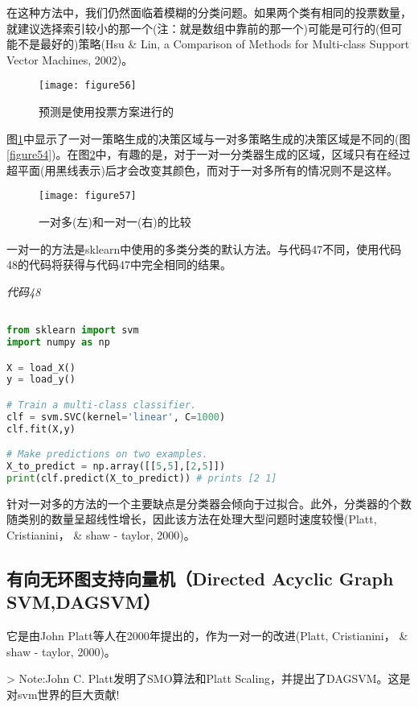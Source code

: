 在这种方法中，我们仍然面临着模糊的分类问题。如果两个类有相同的投票数量，就建议选择索引较小的那一个(注：就是数组中靠前的那一个)可能是可行的(但可能不是最好的)策略(Hsu \& Lin, a Comparison of Methods for Multi-class Support Vector Machines, 2002)。

\begin{figure}[ht]
	\centering
	\texttt{[image: figure56]}
	\caption{预测是使用投票方案进行的}
	\label{figure56}
\end{figure}


图\ref{figure56}中显示了一对一策略生成的决策区域与一对多策略生成的决策区域是不同的(图\ref{figure54})。在图\ref{figure57}中，有趣的是，对于一对一分类器生成的区域，区域只有在经过超平面(用黑线表示)后才会改变其颜色，而对于一对多所有的情况则不是这样。

\begin{figure}[ht]
	\centering
	\texttt{[image: figure57]}
	\caption{一对多(左)和一对一(右)的比较}
	\label{figure57}
\end{figure}

一对一的方法是sklearn中使用的多类分类的默认方法。与代码47不同，使用代码48的代码将获得与代码47中完全相同的结果。

\emph{代码48}

\begin{lstlisting}[language=python]

from sklearn import svm 
import numpy as np 

X = load_X() 
y = load_y() 

# Train a multi-class classifier. 
clf = svm.SVC(kernel='linear', C=1000) 
clf.fit(X,y) 

# Make predictions on two examples. 
X_to_predict = np.array([[5,5],[2,5]]) 
print(clf.predict(X_to_predict)) # prints [2 1]
\end{lstlisting}

针对一对多的方法的一个主要缺点是分类器会倾向于过拟合。此外，分类器的个数随类别的数量呈超线性增长，因此该方法在处理大型问题时速度较慢(Platt, Cristianini， \& shaw - taylor, 2000)。


\subsection{有向无环图支持向量机（Directed Acyclic Graph SVM,DAGSVM）}

它是由John Platt等人在2000年提出的，作为一对一的改进(Platt, Cristianini， \& shaw - taylor, 2000)。

> Note:John C. Platt发明了SMO算法和Platt Scaling，并提出了DAGSVM。这是对svm世界的巨大贡献!

